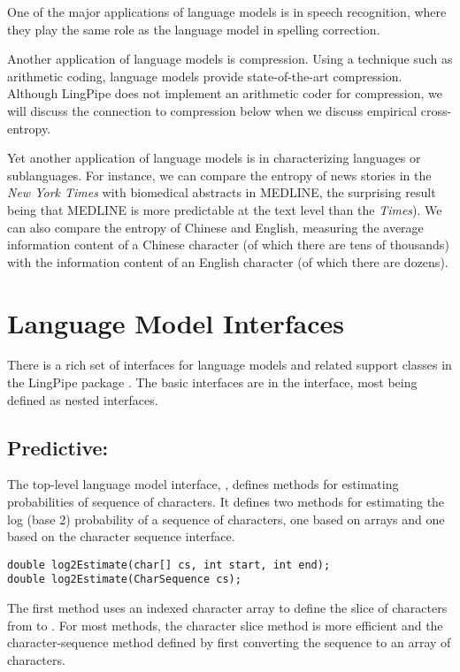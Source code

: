 One of the major applications of language models is in speech
recognition, where they play the same role as the language model in
spelling correction.  

Another application of language models is compression.  Using a
technique such as arithmetic coding, language models provide
state-of-the-art compression.  Although LingPipe does not implement an
arithmetic coder for compression, we will discuss the connection to
compression below when we discuss empirical cross-entropy.

Yet another application of language models is in characterizing
languages or sublanguages.  For instance, we can compare the entropy
of news stories in the {\it New York Times} with biomedical abstracts
in MEDLINE, the surprising result being that MEDLINE is more
predictable at the text level than the {\it Times}).  We can also
compare the entropy of Chinese and English, measuring the average
information content of a Chinese character (of which there are tens of
thousands) with the information content of an English character (of
which there are dozens).

\section{Language Model Interfaces}

There is a rich set of interfaces for language models and related
support classes in the LingPipe package .  The
basic interfaces are in the  interface, most
being defined as nested interfaces.

\subsection{Predictive: }

The top-level language model interface, , defines
methods for estimating probabilities of sequence of characters.  It
defines two methods for estimating the log (base 2) probability of a
sequence of characters, one based on arrays and one based on the
character sequence interface.
%
\begin{verbatim}
double log2Estimate(char[] cs, int start, int end);
double log2Estimate(CharSequence cs);
\end{verbatim}
%
The first method uses an indexed character array to define the slice
of characters from  to .  For most
methods, the character slice method is more efficient and the
character-sequence method defined by first converting the sequence to
an array of characters.

